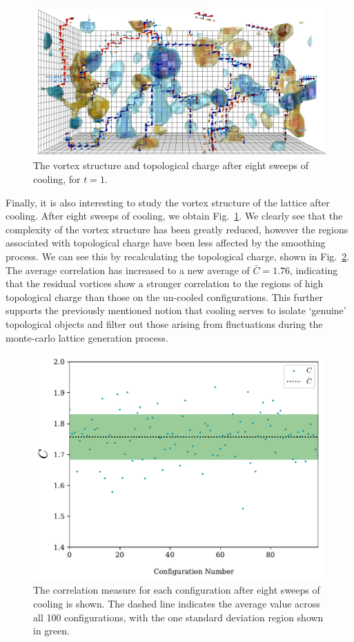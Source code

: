 \begin{figure}
\centering
\includegraphics[width=\linewidth]{./PlaqLinkTopQ_CFG95_T01_8SW.png}
\caption{\label{fig:PlaqLinkTopQ_SW8}The vortex structure and topological charge after eight sweeps of cooling, for $t=1$.}
\end{figure}
%

Finally, it is also interesting to study the vortex structure of the lattice after cooling. After eight sweeps of cooling, we obtain Fig.~\ref{fig:PlaqLinkTopQ_SW8}. We clearly see that the complexity of the vortex structure has been greatly reduced, however the regions associated with topological charge have been less affected by the smoothing process. We can see this by recalculating the topological charge, shown in Fig.~\ref{fig:Correlation_sw07}. The average correlation has increased to a new average of $\bar{C}=1.76$, indicating that the residual vortices show a stronger correlation to the regions of high topological charge than those on the un-cooled configurations. This further supports the previously mentioned notion that cooling serves to isolate `genuine' topological objects and filter out those arising from fluctuations during the monte-carlo lattice generation process.
%

\begin{figure}
\centering
\includegraphics[width=0.8\linewidth]{./Correlation_sw07.pdf}
\caption{\label{fig:Correlation_sw07}The correlation measure for each configuration after eight sweeps of cooling is shown. The dashed line indicates the average value across all 100 configurations, with the one standard deviation region shown in green.}
\end{figure}

